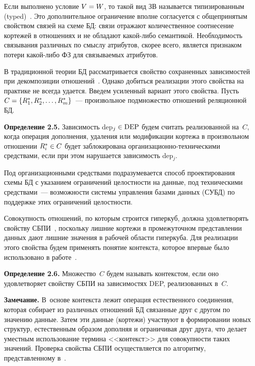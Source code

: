 \begin{multicols}{2}
  Если выполнено условие $V\hm=W$, то такой вид ЗВ называется 
типизированным (typed)~\cite{13-z, 14-z}. Это дополнительное ограничение 
вполне согласуется с общепринятым свойством связей на схеме БД: связи 
отражают количественное соотнесение кортежей в отношениях и не обладают 
ка\-кой-ли\-бо семантикой. Необходимость связывания различных по смыслу 
атрибутов, скорее всего, является признаком потери ка\-кой-ли\-бо ФЗ для 
свя\-зы\-ва\-емых атрибутов.
  
  В традиционной теории БД рассматривается свойство сохраненных 
зависимостей при декомпозиции отношений~\cite{1-z}. Однако добиться 
реализации этого свойства на практике не всегда удается. Введем усиленный 
вариант этого свойства. Пусть $C\hm=\{ R_1^*, R_2^*, \ldots , R_m^*\}$~--- 
произвольное подмножество отношений реляционной БД.
  
  \smallskip
  
  \noindent
  \textbf{Определение 2.5.} Зависимость dep$_j\hm\in \mathrm{DEP}$ будем считать 
реализованной на~$C$, когда операция дополнения, удаления или 
модификации кортежа в произвольном отношении $R_i^*\hm\in C$ будет 
заблокирована ор\-га\-ни\-за\-ци\-он\-но-тех\-ни\-че\-ски\-ми средствами, если 
при этом нарушается зависимость dep$_j$.
  \smallskip
  
  Под организационными средствами подразумевается способ проектирования 
схемы БД с указанием ограничений целостности на данные, под техническими 
средствами~--- возможности системы управления базами данных (СУБД) по 
поддержке этих ограничений целостности.
  
  Совокупность отношений, по которым строится гиперкуб, должна 
удовлетворять свойству СБПИ~\cite{15-z}, поскольку лишние кортежи в 
промежуточном представлении данных дают лишние значения в рабочей 
области гиперкуба. Для реализации этого свойства будем применять понятие 
контекста, которое впервые было использовано в работе~\cite{16-z}.
  
  \smallskip
  
  \noindent
  \textbf{Определение 2.6.} Множество~$C$ будем называть контекстом, если 
оно удовлетворяет свойству СБПИ на зависимостях DEP, реализованных 
в~$C$.
  \smallskip
  
  \noindent
  \textbf{Замечание.} В~основе контекста лежит операция естественного 
соединения, которая собирает из различных отношений БД связанные друг с 
другом по значению данные. Затем эти данные (кортежи) участвуют в 
формировании новых структур, естественным образом дополняя и ограничивая 
друг друга, что делает уместным использование термина <<контекст>> для 
совокупности таких значений. Проверка свойства СБПИ осуществляется по 
алгоритму, представленному в~\cite{10-z}.


\end{multicols}
